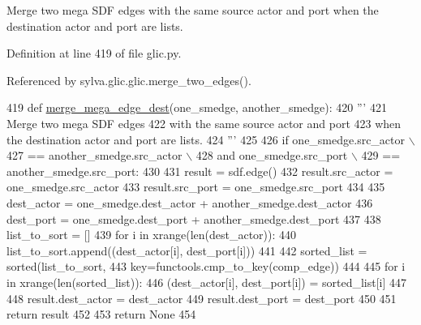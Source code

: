 \begin{DoxyVerb}  Merge two mega SDF edges
  with the same source actor and port
  when the destination actor and port are lists.
\end{DoxyVerb}
 

Definition at line 419 of file glic.\+py.



Referenced by sylva.\+glic.\+glic.\+merge\+\_\+two\+\_\+edges().


\begin{DoxyCode}
419   \textcolor{keyword}{def }\hyperlink{namespacesylva_1_1glic_1_1glic_a80e6906ee9b3a3c96085594f6dab2f84}{merge\_mega\_edge\_dest}(one\_smedge, another\_smedge):
420     \textcolor{stringliteral}{'''}
421 \textcolor{stringliteral}{      Merge two mega SDF edges}
422 \textcolor{stringliteral}{      with the same source actor and port}
423 \textcolor{stringliteral}{      when the destination actor and port are lists.}
424 \textcolor{stringliteral}{    '''}
425 
426     \textcolor{keywordflow}{if} one\_smedge.src\_actor \(\backslash\)
427             == another\_smedge.src\_actor \(\backslash\)
428             \textcolor{keywordflow}{and} one\_smedge.src\_port \(\backslash\)
429             == another\_smedge.src\_port:
430 
431       result = sdf.edge()
432       result.src\_actor = one\_smedge.src\_actor
433       result.src\_port = one\_smedge.src\_port
434 
435       dest\_actor = one\_smedge.dest\_actor + another\_smedge.dest\_actor
436       dest\_port = one\_smedge.dest\_port + another\_smedge.dest\_port
437 
438       list\_to\_sort = []
439       \textcolor{keywordflow}{for} i \textcolor{keywordflow}{in} xrange(len(dest\_actor)):
440         list\_to\_sort.append((dest\_actor[i], dest\_port[i]))
441 
442       sorted\_list = sorted(list\_to\_sort,
443                            key=functools.cmp\_to\_key(comp\_edge))
444 
445       \textcolor{keywordflow}{for} i \textcolor{keywordflow}{in} xrange(len(sorted\_list)):
446         (dest\_actor[i], dest\_port[i]) = sorted\_list[i]
447 
448       result.dest\_actor = dest\_actor
449       result.dest\_port = dest\_port
450 
451       \textcolor{keywordflow}{return} result
452 
453     \textcolor{keywordflow}{return} \textcolor{keywordtype}{None}
454 
\end{DoxyCode}
\mbox{\label{namespacesylva_1_1glic_1_1glic_aaa193270639d512daa1cf9fc2f952fdb}} 
